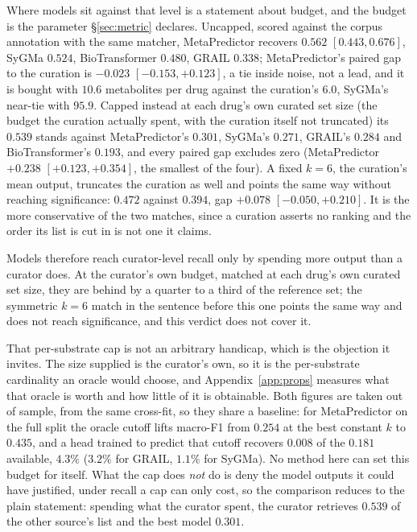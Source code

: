 Where models sit against that level is a statement about budget, and the budget is the parameter
\S\ref{sec:metric} declares. Uncapped, scored against the corpus annotation with the same matcher,
MetaPredictor recovers $0.562$ $[0.443,0.676]$, SyGMa $0.524$, BioTransformer $0.480$, GRAIL
$0.338$; MetaPredictor's paired gap to the curation is $-0.023$ $[-0.153,+0.123]$, a tie inside
noise, not a lead, and it is bought with $10.6$ metabolites per drug against the curation's
$6.0$, SyGMa's near-tie with $95.9$. Capped instead at each drug's own curated set size (the
budget the curation actually spent, with the curation itself not truncated) its $0.539$ stands
against MetaPredictor's $0.301$, SyGMa's $0.271$, GRAIL's $0.284$ and BioTransformer's $0.193$, and
every paired gap excludes zero (MetaPredictor $+0.238$ $[+0.123,+0.354]$, the smallest of the four).
A fixed $k{=}6$, the curation's mean output, truncates the curation as well and points the same way
without reaching significance: $0.472$ against $0.394$, gap $+0.078$ $[-0.050,+0.210]$. It is the
more conservative of the two matches, since a curation asserts no ranking and the order its list is
cut in is not one it claims.

Models therefore reach curator-level recall only by spending more output than a curator does. At the
curator's own budget, matched at each drug's own curated set size, they are behind by a quarter to a
third of the reference set; the symmetric $k{=}6$ match in the sentence before this one points the
same way and does not reach significance, and this verdict does not cover it.

That per-substrate cap is not an arbitrary handicap, which is the objection it invites. The size
supplied is the curator's own, so it is the per-substrate cardinality an oracle would choose, and
Appendix~\ref{app:props} measures what that oracle is worth and how little of it is obtainable. Both
figures are taken out of sample, from the same cross-fit, so they share a baseline: for
MetaPredictor on the full split the oracle cutoff lifts macro-F1 from $0.254$ at the best constant
$k$ to $0.435$, and a head trained to predict that cutoff recovers $0.008$ of the $0.181$ available,
$4.3\%$ ($3.2\%$ for GRAIL, $1.1\%$ for SyGMa). No method here can set this budget for itself. What
the cap does \emph{not} do is deny the model outputs it could have justified, under recall a cap
can only cost, so the comparison reduces to the plain statement: spending what the curator spent,
the curator retrieves $0.539$ of the other source's list and the best model $0.301$.

